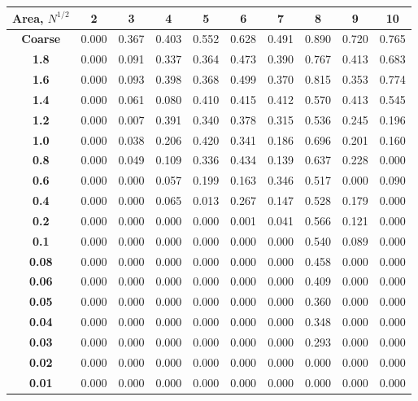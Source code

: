 \documentclass[xcolor={usenames,dvipsnames,svgnames,table}]{beamer}
\begin{document}
\begin{frame}[t]
\begin{table}[H]
{\begin{tabular}{c|c|c|c|c|c|c|c|c|c}
\bf Area, $N^{1/2}$ & \bf  2 & \bf 3    &  \bf  4   &  \bf  5   &  \bf 6    &  \bf  7   &   \bf 8   &  \bf 9    &  \bf 10   \\ \hline \hline
\bf Coarse& 0.000 & 0.367 & 0.403 & 0.552 & 0.628 & 0.491 & 0.890 & 0.720 & 0.765 \\ \hline 
 \bf 1.8& 0.000 & 0.091 & 0.337 & 0.364 & 0.473 & 0.390 & 0.767 & 0.413 & 0.683 \\ \hline 
 \bf 1.6& 0.000 & 0.093 & 0.398 & 0.368 & 0.499 & 0.370 & 0.815 & 0.353 & 0.774 \\ \hline 
 \bf 1.4& 0.000 & 0.061 & 0.080 & 0.410 & 0.415 & 0.412 & 0.570 & 0.413 & 0.545 \\ \hline 
 \bf 1.2& 0.000 & 0.007 & 0.391 & 0.340 & 0.378 & 0.315 & 0.536 & 0.245 & 0.196 \\ \hline 
 \bf 1.0& 0.000 & 0.038 & 0.206 & 0.420 & 0.341 & 0.186 & 0.696 & 0.201 & 0.160 \\ \hline 
 \bf 0.8& 0.000 & 0.049 & 0.109 & 0.336 & 0.434 & 0.139 & 0.637 & 0.228 & 0.000 \\ \hline 
 \bf 0.6& 0.000 & 0.000 & 0.057 & 0.199 & 0.163 & 0.346 & 0.517 & 0.000 & 0.090 \\ \hline 
 \bf 0.4& 0.000 & 0.000 & 0.065 & 0.013 & 0.267 & 0.147 & 0.528 & 0.179 & 0.000 \\ \hline 
 \bf 0.2& 0.000 & 0.000 & 0.000 & 0.000 & 0.001 & 0.041 & 0.566 & 0.121 & 0.000 \\ \hline 
 \bf 0.1& 0.000 & 0.000 & 0.000 & 0.000 & 0.000 & 0.000 & 0.540 & 0.089 & 0.000 \\ \hline 
 \bf 0.08&0.000 & 0.000 & 0.000 & 0.000 & 0.000 & 0.000 & 0.458 & 0.000 & 0.000 \\ \hline 
 \bf 0.06&0.000 & 0.000 & 0.000 & 0.000 & 0.000 & 0.000 & 0.409 & 0.000 & 0.000 \\ \hline 
 \bf 0.05&0.000 & 0.000 & 0.000 & 0.000 & 0.000 & 0.000 & 0.360 & 0.000 & 0.000 \\ \hline 
 \bf 0.04&0.000 & 0.000 & 0.000 & 0.000 & 0.000 & 0.000 & 0.348 & 0.000 & 0.000 \\ \hline 
 \bf 0.03&0.000 & 0.000 & 0.000 & 0.000 & 0.000 & 0.000 & 0.293 & 0.000 & 0.000 \\ \hline 
 \bf 0.02&0.000 & 0.000 & 0.000 & 0.000 & 0.000 & 0.000 & 0.000 & 0.000 & 0.000 \\ \hline 
 \bf 0.01&0.000 & 0.000 & 0.000 & 0.000 & 0.000 & 0.000 & 0.000 & 0.000 & 0.000 \\ \hline 
\end{tabular}}
\scalebox{0.4}{
}
\end{table}
\end{frame}
\end{document}
